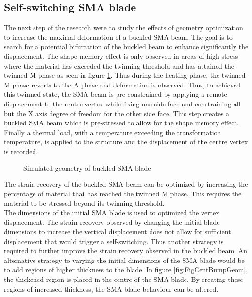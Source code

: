 \subsection{Self-switching SMA blade}
The next step of the research were to study the effects of geometry optimization to increase the maximal deformation of a buckled SMA beam. The goal is to search for a potential bifurcation of the buckled beam to enhance significantly the displacement. The shape memory effect is only observed in areas of high stress where the material has exceeded the twinning threshold and has attained the twinned M phase as seen in figure \ref{fig:FigSMABlade}. Thus during the heating phase, the twinned M phase reverts to the A phase and deformation is observed. Thus, to achieved this twinned state, the SMA beam is pre-constrained by applying a remote displacement to the centre vertex while fixing one side face and constraining all but the X axis degree of freedom for the other side face. This step creates a buckled SMA beam which is pre-stressed to allow for the shape memory effect. Finally a thermal load, with a temperature exceeding the transformation temperature, is applied to the structure and the displacement of the centre vertex is recorded.
\begin{figure}[H]
	\centering
	\def\svgwidth{0.5\textwidth}
	
	\caption{Simulated geometry of buckled SMA blade}
	\label{fig:FigSMABlade}
\end{figure}
The strain recovery of the buckled SMA beam can be optimized by increasing the percentage of material that has reached the twinned M phase. This requires the material to be stressed beyond its twinning threshold.\\

The dimensions of the initial SMA blade is used to optimized the vertex displacement. The strain recovery observed by changing the initial blade dimensions to increase the vertical displacement does not allow for sufficient displacement that would trigger a self-switching. Thus another strategy is required to further improve the strain recovery observed in the buckled beam. An alternative strategy to varying the initial dimensions of the SMA blade would be to add regions of higher thickness to the blade. In figure \ref{fig:FigCentBumpGeom}, the thickened region is placed in the centre of the SMA blade. By creating these regions of increased thickness, the SMA blade behaviour can be altered.

